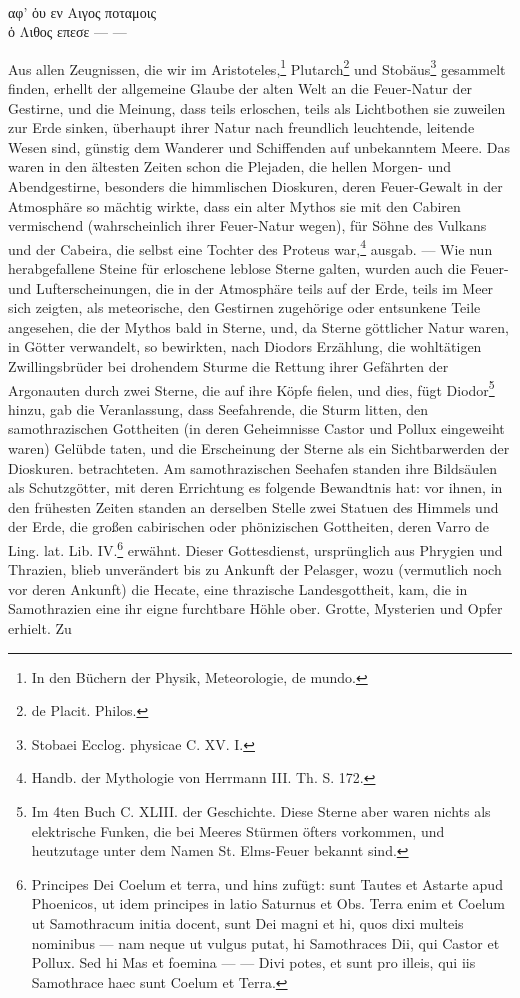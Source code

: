 \documentclass[a4paper, 11pt, oneside, polutonikogreek, german]{article}
\begin{document}
\vspace{1pt}
\\
αφ' ὁυ εν Αιγος ποταμοις\\
ὁ Λιθος επεσε --- ---\\
\vspace{1pt}

Aus allen Zeugnissen, die wir im Aristoteles,\footnote{In den Büchern der Physik, Meteorologie, de mundo.} Plutarch\footnote{de Placit. Philos.} und Stobäus\footnote{Stobaei Ecclog. physicae C. XV. I.} gesammelt finden, erhellt der allgemeine Glaube der alten Welt an die Feuer-Natur der Gestirne, und die Meinung, dass teils erloschen, teils als Lichtbothen sie zuweilen zur Erde sinken, überhaupt ihrer Natur nach freundlich leuchtende, leitende Wesen sind, günstig dem Wanderer und Schiffenden auf unbekanntem Meere. Das waren in den ältesten Zeiten schon die Plejaden, die hellen Morgen- und Abendgestirne, besonders die himmlischen Dioskuren, deren Feuer-Gewalt in der Atmosphäre so mächtig wirkte, dass ein alter Mythos sie mit den Cabiren vermischend (wahrscheinlich ihrer Feuer-Natur wegen), für Söhne des Vulkans und der Cabeira, die selbst eine Tochter des Proteus war,\footnote{Handb. der Mythologie von Herrmann III. Th. S. 172.} ausgab. --- Wie nun herabgefallene Steine für erloschene leblose Sterne galten, wurden auch die Feuer- und Lufterscheinungen, die in der Atmosphäre teils auf der Erde, teils im Meer sich zeigten, als meteorische, den Gestirnen zugehörige oder entsunkene Teile angesehen, die der Mythos bald in Sterne, und, da Sterne göttlicher Natur waren, in Götter verwandelt, so bewirkten, nach Diodors Erzählung, die wohltätigen Zwillingsbrüder bei drohendem Sturme die Rettung ihrer Gefährten der Argonauten durch zwei Sterne, die auf ihre Köpfe fielen, und dies, fügt Diodor\footnote{Im 4ten Buch C. XLIII. der Geschichte. Diese Sterne aber waren nichts als elektrische Funken, die bei Meeres Stürmen öfters vorkommen, und heutzutage unter dem Namen St. Elms-Feuer bekannt sind.} hinzu, gab die Veranlassung, dass Seefahrende, die Sturm litten, den samothrazischen Gottheiten (in deren Geheimnisse Castor und Pollux eingeweiht waren) Gelübde taten, und die Erscheinung der Sterne als ein Sichtbarwerden der Dioskuren. betrachteten. Am samothrazischen Seehafen standen ihre Bildsäulen als Schutzgötter, mit deren Errichtung es folgende Bewandtnis hat: vor ihnen, in den frühesten Zeiten standen an derselben Stelle zwei Statuen des Himmels und der Erde, die großen cabirischen oder phönizischen Gottheiten, deren Varro de Ling. lat. Lib. IV.\footnote{Principes Dei Coelum et terra, und hins zufügt: sunt Tautes et Astarte apud Phoenicos, ut idem principes in latio Saturnus et Obs. Terra enim et Coelum ut Samothracum initia docent, sunt Dei magni et hi, quos dixi multeis nominibus --- nam neque ut vulgus putat, hi Samothraces Dii, qui Castor et Pollux. Sed hi Mas et foemina --- --- Divi potes, et sunt pro illeis, qui iis Samothrace haec sunt Coelum et Terra.} erwähnt. Dieser Gottesdienst, ursprünglich aus Phrygien und Thrazien, blieb unverändert bis zu Ankunft der Pelasger, wozu (vermutlich noch vor deren Ankunft) die Hecate, eine thrazische Landesgottheit, kam, die in Samothrazien eine ihr eigne furchtbare Höhle ober. Grotte, Mysterien und Opfer erhielt. Zu 
\end{document}
